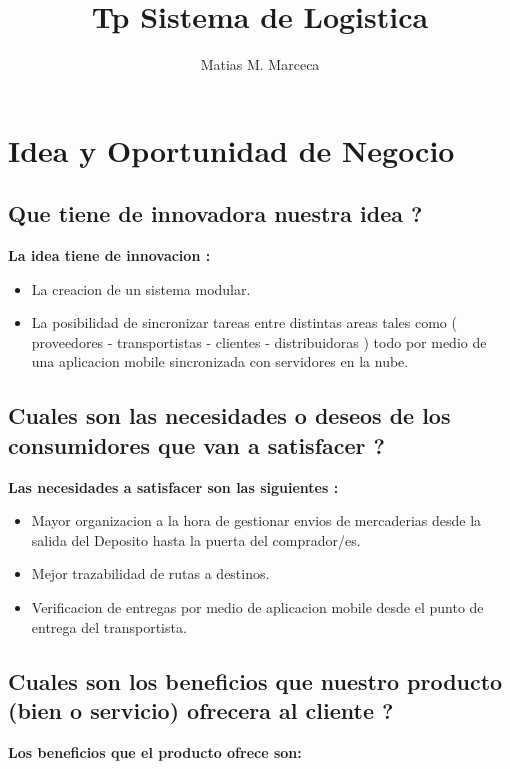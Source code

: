 \documentclass[
10pt, %
a4paper, %
oneside, %
headinclude,footinclude, %
BCOR5mm, %
]{scrartcl}
\title{Tp Sistema de Logistica}
\author{Matias M. Marceca}
\date{}
\begin{document}
\maketitle

\tableofcontents

\pagebreak

\section{Idea y Oportunidad de Negocio}

\subsection{Que tiene de innovadora nuestra idea ?}
\textbf{La idea tiene de innovacion :}

\begin{itemize}
    \item { La creacion de un sistema modular. }
    \item { La posibilidad de sincronizar tareas entre distintas areas
        tales como ( proveedores - transportistas - clientes - distribuidoras )
        todo por medio de una aplicacion mobile sincronizada con
        servidores en la nube.}
\end{itemize}

\subsection{Cuales son las necesidades o deseos de los consumidores
            que van a satisfacer ?}
\textbf{Las necesidades a satisfacer son las siguientes :}

\begin{itemize}
    \item { Mayor organizacion a la hora de gestionar envios de mercaderias
              desde la salida del Deposito hasta la puerta del comprador/es. }
    \item { Mejor trazabilidad de rutas a destinos. }
    \item { Verificacion de entregas por medio de aplicacion mobile
        desde el punto de entrega del transportista. }
\end{itemize}

\subsection{Cuales son los beneficios que nuestro producto (bien o servicio)
             ofrecera al cliente ?}
\textbf { Los beneficios que el producto ofrece son: }
\end{document}
